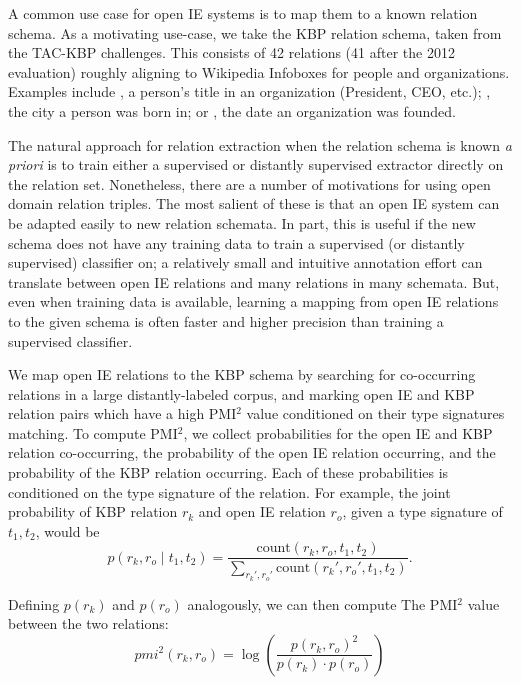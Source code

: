 A common use case for open IE systems is to map them to a
  known relation schema.
As a motivating use-case, we take the KBP relation schema, taken from
  the TAC-KBP challenges.
This consists of 42 relations (41 after the 2012 evaluation) roughly
  aligning to Wikipedia Infoboxes for people and organizations.
  Examples include , a person's title in an
  organization (President, CEO, etc.); , the
  city a person was born in; or , the date an organization
  was founded.

The natural approach for relation extraction when the relation
  schema is known \textit{a priori} is to train either 
  a supervised or distantly supervised extractor
  directly on the relation set.
Nonetheless, there are a number of motivations for using open domain
  relation triples.
The most salient of these is that an open IE system can be adapted
  easily to new relation schemata.
In part, this is useful if the new schema does not have any training data
  to train a supervised (or distantly supervised) classifier on; a relatively
  small and intuitive annotation effort can translate between open IE relations
  and many relations in many schemata.
But, even when training data is available, learning a mapping from open IE
  relations to the given schema is often faster and higher precision than
  training a supervised classifier.

We map open IE relations to the KBP schema by searching for co-occurring
  relations in a large distantly-labeled corpus, and marking open IE and
  KBP relation pairs which have a high PMI$^2$ value conditioned on their
  type signatures matching.
To compute PMI$^2$, we collect probabilities for the open IE and KBP
  relation co-occurring, the probability of the open IE relation occurring,
  and the probability of the KBP relation occurring.
Each of these probabilities is conditioned on the type signature of the relation.
For example, the joint probability of KBP relation $r_k$ and open IE relation
  $r_o$, given a type signature of $t_1, t_2$, would be
\begin{equation*}
  p(r_k, r_o \mid t_1, t_2) = \frac{
    \textrm{count}(r_k, r_o,  t_1, t_2)
  }{
    \sum_{r_k', r_o'}\textrm{count}(r_k', r_o', t_1, t_2)
  }.
\end{equation*}

Defining $p(r_k)$ and $p(r_o)$ analogously,
  we can then compute The PMI$^2$ value between the two relations:
\begin{equation*}
  pmi^2(r_k, r_o) = \log \left( \frac{p(r_k, r_o)^2}{p(r_k) \cdot p(r_o)} \right)
\end{equation*}

